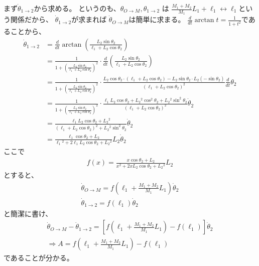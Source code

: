 \documentclass[a4paper,11pt]{jsarticle}
\begin{document}
まず$\dot\theta_{1\rightarrow 2}$から求める。
というのも、$\theta_{O\rightarrow M}, \theta_{1\rightarrow 2}$
は
$\frac{M_1+M_2}{M_1}L_1+\ell_1 \leftrightarrow \ell_1$という関係だから、
$\dot\theta_{1\rightarrow 2}$が求まれば
$\dot\theta_{O\rightarrow M}$は簡単に求まる。
$\frac{d}{dt}\arctan t = \frac{1}{1+t^2}$であることから、
\begin{align*}
  \dot\theta_{1\rightarrow 2}
  &= \frac{d}{dt}
  \arctan
  \left(\frac{ L_2\sin\theta_2}{\ell_1+L_2\cos\theta_2} \right)
  \\
  &=\frac{1}{1+\left(\frac{ L_2\sin\theta_2}{\ell_1+L_2\cos\theta_2} \right)^2}
  \cdot
  \frac{d}{dt}\left(
    \frac{L_2\sin\theta_2}{\ell_1+L_2\cos\theta_2}
  \right)
  \\
  &= \frac{1}{1+\left(\frac{ L_2\sin\theta_2}{\ell_1+L_2\cos\theta_2} \right)^2}
  \cdot
  \frac{
    L_2\cos\theta_2\cdot (\ell_1+L_2\cos\theta_2) - L_2\sin\theta_2\cdot L_2(-\sin\theta_2)
  }{
    (\ell_1+L_2\cos\theta_2)^2
  }
  \frac{d}{dt}\theta_2
  \\
  &= \frac{1}{1+\left(\frac{ L_2\sin\theta_2}{\ell_1+L_2\cos\theta_2} \right)^2}
  \cdot
  \frac{
    \ell_1L_2\cos\theta_2 + L_2{}^2\cos^2\theta_2 + L_2{}^2\sin^2\theta_2
  }{
    (\ell_1+L_2\cos\theta_2)^2
  }
  \dot\theta_2
  \\
  &= \frac{
    \ell_1L_2\cos\theta_2 + L_2{}^2
  }{
    (\ell_1+L_2\cos\theta_2)^2 + L_2{}^2\sin^2\theta_2
  }
  \dot\theta_2
  \\
  &= \frac{
    \ell_1\cos\theta_2 + L_2
  }{
    \ell_1{}^2 + 2\ell_1L_2\cos\theta_2 + L_2{}^2
  }
  L_2
  \dot\theta_2
\end{align*}
ここで
\begin{gather*}
  f(x) = \frac{
    x\cos\theta_2 + L_2
  }{
    x^2 + 2xL_2\cos\theta_2 + L_2{}^2
  }
  L_2
\end{gather*}
とすると、
\begin{gather*}
  \dot\theta_{O\rightarrow M} = f\left(\ell_1 + \frac{M_1+M_2}{M_1}L_1\right)\dot\theta_2
  \\
  \dot\theta_{1\rightarrow 2} = f(\ell_1)\dot\theta_2
\end{gather*}
と簡潔に書け、
\begin{gather*}
  \dot\theta_{O\rightarrow M} - \dot\theta_{1\rightarrow 2}
  = \left[
    f\left(\ell_1 + \frac{M_1+M_2}{M_1}L_1\right) - f(\ell_1)
  \right]\dot\theta_2
  \\
  \Rightarrow
  A = f\left(\ell_1 + \frac{M_1+M_2}{M_1}L_1\right) - f(\ell_1)
\end{gather*}
であることが分かる。
\end{document}
